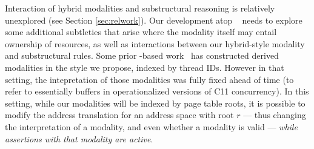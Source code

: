 Interaction of hybrid modalities and substructural reasoning is relatively unexplored (see Section \ref{sec:relwork}).
Our development atop \iris~\cite{jung2018iris} needs to explore some additional subtleties 
that arise where the modality itself may entail ownership of resources, 
as well as interactions between our hybrid-style 
modality and substructural rules.  
Some prior \iris-based work~\cite{dang2019rustbelt,dang2022compass} has constructed derived modalities in the style we propose, indexed
by thread IDs. However in that setting, the intepretation of those modalities was fully fixed ahead of time (to refer to essentially buffers in operationalized versions of C11
concurrency). In this setting, while our modalities will be indexed by page table roots, it is possible to modify the address translation for an address
space with root $r$ --- thus changing the interpretation of a modality, and even whether a modality is valid --- \emph{while assertions with that modality are active}.
%
%
